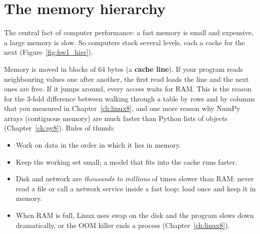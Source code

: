 \section*{The memory hierarchy}
The central fact of computer performance: a fast memory is small and expensive, a large memory is slow. So computers stack several levels, each a cache for the next (Figure~\ref{fig:hw1_hier}).
\begin{center}
\label{fig:hw1_hier}
\end{center}
Memory is moved in blocks of $64$ bytes (a \textbf{cache line}). If your program reads neighbouring values one after another, the first read loads the line and the next ones are free. If it jumps around, every access waits for RAM. This is the reason for the $3$-fold difference between walking through a table by rows and by columns that you measured in Chapter~\ref{ch:linux8}, and one more reason why NumPy arrays (contiguous memory) are much faster than Python lists of objects (Chapter~\ref{ch:py8}). Rules of thumb:
\begin{itemize}[nosep]
  \item Work on data in the order in which it lies in memory.
  \item Keep the working set small; a model that fits into the cache runs faster.
  \item Disk and network are \emph{thousands to millions} of times slower than RAM: never read a file or call a network service inside a fast loop; load once and keep it in memory.
  \item When RAM is full, Linux uses swap on the disk and the program slows down dramatically, or the OOM killer ends a process (Chapter~\ref{ch:linux8}).
\end{itemize}

